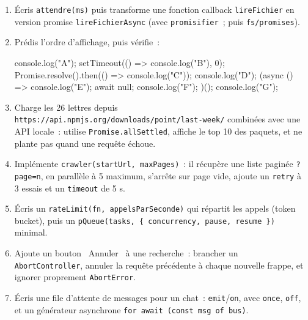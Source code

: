 \documentclass[12pt,a4paper,twoside,openright]{book}
\begin{document}

\begin{exercice}
\begin{enumerate}
  \item \'Ecris \verb|attendre(ms)| puis transforme une fonction callback \verb|lireFichier| en
        version promise \verb|lireFichierAsync| (avec \verb|promisifier|~; puis \verb|fs/promises|).
  \item Pr\'edis l'ordre d'affichage, puis v\'erifie~:
\begin{codeplain}
console.log("A");
setTimeout(() => console.log("B"), 0);
Promise.resolve().then(() => console.log("C"));
console.log("D");
(async () => { console.log("E"); await null; console.log("F"); })();
console.log("G");
\end{codeplain}
  \item Charge les 26 lettres depuis \verb|https://api.npmjs.org/downloads/point/last-week/|
        combin\'ees avec une API locale~: utilise \verb|Promise.allSettled|, affiche le top 10 des
        paquets, et ne plante pas quand une requ\^ete \'echoue.
  \item Impl\'emente \verb|crawler(startUrl, maxPages)|~: il r\'ecup\`ere une liste pagin\'ee
        \verb|?page=n|, en parall\`ele \`a 5 maximum, s'arr\^ete sur page vide, ajoute un
        \verb|retry| \`a 3 essais et un \verb|timeout| de 5 s.
  \item \'Ecris un \verb|rateLimit(fn, appelsParSeconde)| qui r\'epartit les appels (token bucket),
        puis un \verb|pQueue(tasks, { concurrency, pause, resume })| minimal.
  \item Ajoute un bouton \og ~Annuler~ \fg{} \`a une recherche~: brancher un \verb|AbortController|,
        annuler la requ\^ete pr\'ec\'edente \`a chaque nouvelle frappe, et ignorer proprement
        \verb|AbortError|.
  \item \'Ecris une file d'attente de messages pour un chat~: \verb|emit|/\verb|on|, avec
        \verb|once|, \verb|off|, et un g\'en\'erateur asynchrone \verb|for await (const msg of bus)|.
\end{enumerate}
\end{exercice}
\end{document}
